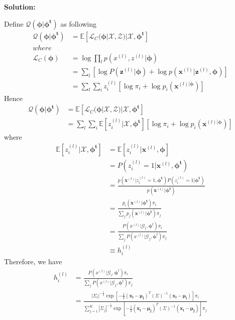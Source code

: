 \documentclass{article}
\newcommand{\E}{\mathbb{E}}
\renewcommand{\b}[1]{\bm{#1}}
\begin{document}
\begin{enumerate}
\begin{enumerate}
		      {\bf Solution:}
              \par Define $\mathcal{Q}(\b{\phi}|\b{\phi^t})$ as following
              \begin{align*}
                \mathcal{Q}(\b{\phi}|\b{\phi^t}) &= \E[\mathcal{L}_C(\b{\phi}|\mathcal{X},\mathcal{Z})|\mathcal{X},\b{\phi^t}]\\
                where&\\
                \mathcal{L}_C(\b{\phi}) &= \log\prod_{l}p(x^{(l)},z^{(l)}|\b{\phi})\\
                &= \sum_l\left[\log P(\b{z}^{(l)}|\b{\phi})+\log p(\b{x}^{(l)}|\b{z}^{(l)},\b{\phi})\right]\\
                &= \sum_l\sum_i z_i^{(l)}[\log \pi_i + \log p_i(\b{x}^{(l)|\b{\phi}})]
              \end{align*}
              Hence
              \begin{align*}
                \mathcal{Q}(\b{\phi}|\b{\phi^t}) &= \E[\mathcal{L}_C(\b{\phi}|\mathcal{X},\mathcal{Z})|\mathcal{X},\b{\phi^t}]\\
                &= \sum_l\sum_i \E[z_i^{(l)}|\mathcal{X},\b{\phi^t}][\log \pi_i + \log p_i(\b{x}^{(l)|\b{\phi}})]
              \end{align*}
              where
              \begin{align*}
                \E[z_i^{(l)}|\mathcal{X},\b{\phi^t}] &= \E[z_i^{(l)}|\b{x}^{(l)},\b{\phi}]\\
                &= P(z_i^{(l)}=1|\b{x}^{(l)},\b{\phi^t})\\
                &= \frac{p(\b{x}^{(l)}|z_i^{(l)}=1,\b{\phi^t})P(z_i^{(l)}=1|\b{\phi^t})}{p(\b{x}^{(l)}|\b{\phi^t})}\\
                &= \frac{p_i(\b{x}^{(l)}|\b{\phi^t})\pi_i}{\sum_jp_j(\b{x}^{(l)}|\b{\phi^t})\pi_j}\\
                &= \frac{P(x^{(l)}|\mathcal{G}_i,\b{\phi}^t)\pi_i}{\sum_jP(x^{(l)}|\mathcal{G}_j,\b{\phi}^t)\pi_j}\\
                &\equiv h_i^{(l)}
              \end{align*}
              Therefore, we have 
              \begin{align*}
                h_i^{(l)} &= \frac{P(x^{(l)}|\mathcal{G}_i,\b{\phi}^t)\pi_i}{\sum_jP(x^{(l)}|\mathcal{G}_j,\b{\phi}^t)\pi_j}\\
                &= \frac{|\Sigma_i|^{-\frac{1}{2}}\exp{[-\frac{1}{2}(\b{x_l}-\b{\mu_i})^T(\Sigma)^{-1}(\b{x_l}-\b{\mu_i})]\pi_i}}{\sum_{j=1}^K|\Sigma_j|^{-\frac{1}{2}}\exp{[-\frac{1}{2}(\b{x_l}-\b{\mu_j})^T(\Sigma)^{-1}(\b{x_l}-\b{\mu_j})]\pi_j}}\\

\end{align*}
\end{enumerate}
\end{enumerate}
\end{document}
